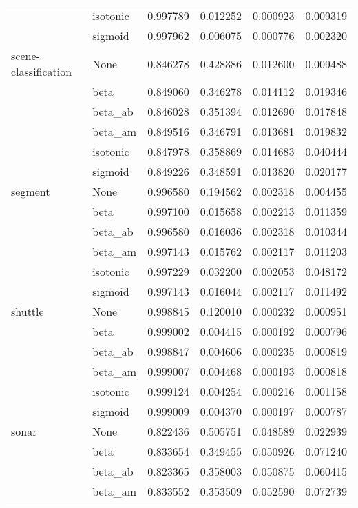 \begin{tabular}{llrrrr}
        & isotonic &  0.997789 &  0.012252 &  0.000923 &  0.009319 \\
        & sigmoid &  0.997962 &  0.006075 &  0.000776 &  0.002320 \\
scene-classification & None &  0.846278 &  0.428386 &  0.012600 &  0.009488 \\
        & beta &  0.849060 &  0.346278 &  0.014112 &  0.019346 \\
        & beta\_ab &  0.846028 &  0.351394 &  0.012690 &  0.017848 \\
        & beta\_am &  0.849516 &  0.346791 &  0.013681 &  0.019832 \\
        & isotonic &  0.847978 &  0.358869 &  0.014683 &  0.040444 \\
        & sigmoid &  0.849226 &  0.348591 &  0.013820 &  0.020177 \\
segment & None &  0.996580 &  0.194562 &  0.002318 &  0.004455 \\
        & beta &  0.997100 &  0.015658 &  0.002213 &  0.011359 \\
        & beta\_ab &  0.996580 &  0.016036 &  0.002318 &  0.010344 \\
        & beta\_am &  0.997143 &  0.015762 &  0.002117 &  0.011203 \\
        & isotonic &  0.997229 &  0.032200 &  0.002053 &  0.048172 \\
        & sigmoid &  0.997143 &  0.016044 &  0.002117 &  0.011492 \\
shuttle & None &  0.998845 &  0.120010 &  0.000232 &  0.000951 \\
        & beta &  0.999002 &  0.004415 &  0.000192 &  0.000796 \\
        & beta\_ab &  0.998847 &  0.004606 &  0.000235 &  0.000819 \\
        & beta\_am &  0.999007 &  0.004468 &  0.000193 &  0.000818 \\
        & isotonic &  0.999124 &  0.004254 &  0.000216 &  0.001158 \\
        & sigmoid &  0.999009 &  0.004370 &  0.000197 &  0.000787 \\
sonar & None &  0.822436 &  0.505751 &  0.048589 &  0.022939 \\
        & beta &  0.833654 &  0.349455 &  0.050926 &  0.071240 \\
        & beta\_ab &  0.823365 &  0.358003 &  0.050875 &  0.060415 \\
        & beta\_am &  0.833552 &  0.353509 &  0.052590 &  0.072739 \\

\end{tabular}
